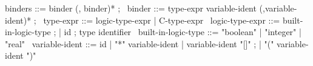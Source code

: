 \begin{syntax}
  binders ::= binder (, binder)* ;
  \
  binder ::= type-expr variable-ident (,variable-ident)* ;
  \
  type-expr ::= logic-type-expr | C-type-expr
  \
  logic-type-expr ::= built-in-logic-type ;
  | id ; type identifier
  \
  built-in-logic-type ::= "boolean" | "integer" | "real" 
  \
  variable-ident ::= id 
  | "*" variable-ident 
  | variable-ident "[]" ;
  | "(" variable-ident ")"
\end{syntax}